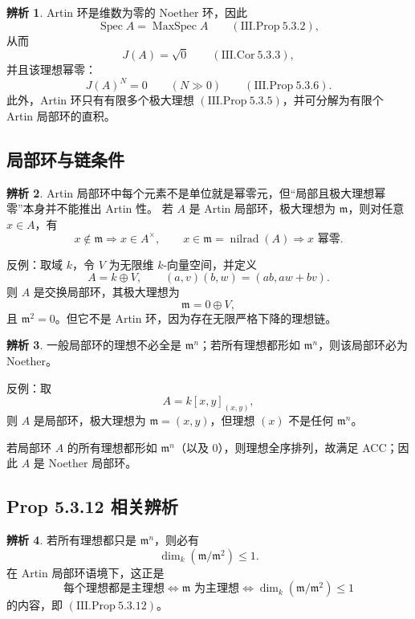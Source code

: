 \documentclass[a4paper]{ctexart}
\theoremstyle{definition}
\theoremstyle{analysis}
\newtheorem{remark}{辨析}[section]
\theoremstyle{plain}
\begin{document}
\begin{remark}
Artin 环是维数为零的 Noether 环，因此
\[
  \operatorname{Spec} A=\operatorname{MaxSpec} A
  \qquad (\mathrm{III.Prop}\ 5.3.2),
\]
从而
\[
  J(A)=\sqrt{0}
  \qquad (\mathrm{III.Cor}\ 5.3.3),
\]
并且该理想幂零：
\[
  J(A)^N=0 \qquad (N\gg 0)
  \qquad (\mathrm{III.Prop}\ 5.3.6).
\]
此外，Artin 环只有有限多个极大理想 \((\mathrm{III.Prop}\ 5.3.5)\)，并可分解为有限个 Artin 局部环的直积。
\end{remark}

\subsection{局部环与链条件}\label{subsec:local-chain}

\begin{remark}
\label{rem:local-chain-counterexample}
Artin 局部环中每个元素不是单位就是幂零元，但“局部且极大理想幂零”本身并不能推出 Artin 性。
若 \(A\) 是 Artin 局部环，极大理想为 \(\mathfrak m\)，则对任意 \(x\in A\)，有
\[
  x\notin \mathfrak m \Rightarrow x\in A^\times,\qquad
  x\in \mathfrak m=\operatorname{nilrad}(A) \Rightarrow x \text{ 幂零}.
\]

反例：取域 \(k\)，令 \(V\) 为无限维 \(k\)-向量空间，并定义
\[
  A=k\oplus V,\qquad
  (a,v)(b,w)=(ab,aw+bv).
\]
则 \(A\) 是交换局部环，其极大理想为
\[
  \mathfrak m=0\oplus V,
\]
且 \(\mathfrak m^2=0\)。但它不是 Artin 环，因为存在无限严格下降的理想链。
\end{remark}

\begin{remark}
\label{rem:local-chain-noether}
一般局部环的理想不必全是 \(\mathfrak m^n\)；若所有理想都形如 \(\mathfrak m^n\)，则该局部环必为 Noether。

反例：取
\[
  A=k[x,y]_{(x,y)},
\]
则 \(A\) 是局部环，极大理想为 \(\mathfrak m=(x,y)\)，但理想 \((x)\) 不是任何 \(\mathfrak m^n\)。

若局部环 \(A\) 的所有理想都形如 \(\mathfrak m^n\)（以及 \(0\)），则理想全序排列，故满足 ACC；因此 \(A\) 是 Noether 局部环。
\end{remark}

\subsection{Prop 5.3.12 相关辨析}\label{subsec:prop5312}

\begin{remark}
\label{rem:prop5312-chain}
若所有理想都只是 \(\mathfrak m^n\)，则必有
\[
  \dim_k(\mathfrak m/\mathfrak m^2)\le 1.
\]
在 Artin 局部环语境下，这正是
\[
  \text{每个理想都是主理想}
  \Longleftrightarrow
  \mathfrak m \text{ 为主理想}
  \Longleftrightarrow
  \dim_k(\mathfrak m/\mathfrak m^2)\le 1
\]
的内容，即 \((\mathrm{III.Prop}\ 5.3.12)\)。
\end{remark}
\end{document}
